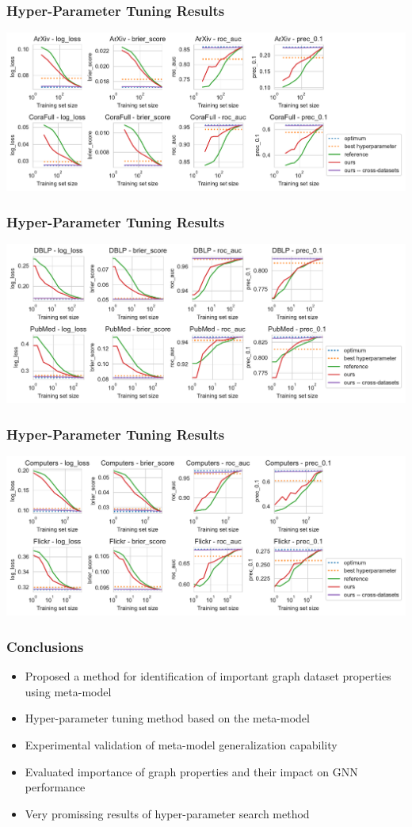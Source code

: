 \documentclass[10pt, 169]{beamer}
\begin{document}
\begin{frame}
	\frametitle{Hyper-Parameter Tuning Results}
	\scalebox{1} {\includegraphics[width=0.9\linewidth]{images/hyperpar_tuning_small1.pdf}}
\end{frame}

\begin{frame}
	\frametitle{Hyper-Parameter Tuning Results}
	\scalebox{1} {\includegraphics[width=0.9\linewidth]{images/hyperpar_tuning_small2.pdf}}
\end{frame}

\begin{frame}
	\frametitle{Hyper-Parameter Tuning Results}
	\scalebox{1} {\includegraphics[width=0.9\linewidth]{images/hyperpar_tuning_small3.pdf}}
\end{frame}

\begin{frame}
	\frametitle{Conclusions}
	\begin{itemize}
		\item Proposed a method for identification of important graph
dataset properties using meta-model
		\item Hyper-parameter tuning method
based on the meta-model
		\item Experimental validation of meta-model generalization capability
		\item Evaluated importance of graph properties and their impact on GNN performance
		\item Very promissing results of hyper-parameter search method
	\end{itemize}
\end{frame}
\end{document}
